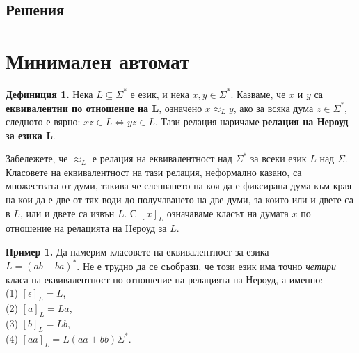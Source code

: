 \documentclass[openany]{book}
\begin{document}
        \vspace{25pt}
        
        \subsection{Решения}
            
        \vspace{15pt}

        \section{Минимален автомат}
            \textbf{Дефиниция 1.} Нека $L \subseteq \Sigma^*$ е език, и нека $x,y \in \Sigma^*$. 
            Казваме, че $x$ и $y$ са \textbf{еквивалентни по отношение на $\boldsymbol{L}$},
            означено $x \approx_L y$, ако за всяка дума $z \in \Sigma^*$, следното е вярно:
            $xz \in L \iff yz \in L$. Тази релация наричаме \textbf{релация на Нероуд за езика $\boldsymbol{L}$}.
        
            \vspace{5pt}
        
            \hspace{15pt} Забележете, че $\approx_L$ е релация на еквивалентност над $\Sigma^*$ за всеки език
            $L$ над $\Sigma$. Класовете на еквивалентност на тази релация, неформално казано,
            са множествата от думи, такива че слепването на коя да е фиксирана дума към края
            на кои да е две от тях
            води до получаването на две думи, за които или и двете са в $L$, или и двете са
            извън $L$. С $[x]_L$ означаваме класът на думата $x$ по отношение на 
            релацията на Нероуд за $L$.  
        
            \vspace{15pt}
            
            \textbf{Пример 1.} Да намерим класовете на еквивалентност за езика \\
            $L = (ab + ba)^*$. Не е трудно да
            се съобрази, че този език има точно \textit{четири} класа на еквивалентност
            по отношение на релацията на Нероуд, а именно: \\
            (1) $[\epsilon]_L = L$, \\
            (2) $[a]_L = La$, \\
            (3) $[b]_L = Lb$, \\
            (4) $[aa]_L = L(aa + bb)\Sigma^*.$ \\
        
\end{document}
